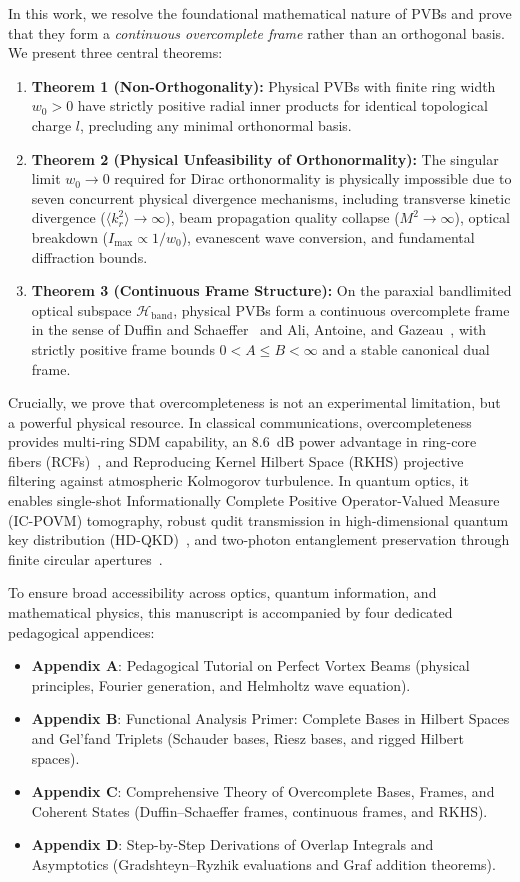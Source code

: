 \documentclass{optica-article}
\begin{document}
In this work, we resolve the foundational mathematical nature of PVBs and prove that they form a \emph{continuous overcomplete frame} rather than an orthogonal basis. We present three central theorems:
\begin{enumerate}
    \item \textbf{Theorem 1 (Non-Orthogonality):} Physical PVBs with finite ring width $w_0 > 0$ have strictly positive radial inner products for identical topological charge $l$, precluding any minimal orthonormal basis.
    \item \textbf{Theorem 2 (Physical Unfeasibility of Orthonormality):} The singular limit $w_0 \to 0$ required for Dirac orthonormality is physically impossible due to seven concurrent physical divergence mechanisms, including transverse kinetic divergence ($\langle k_r^2 \rangle \to \infty$), beam propagation quality collapse ($M^2 \to \infty$), optical breakdown ($I_{\max} \propto 1/w_0$), evanescent wave conversion, and fundamental diffraction bounds.
    \item \textbf{Theorem 3 (Continuous Frame Structure):} On the paraxial bandlimited optical subspace $\mathcal{H}_{\text{band}}$, physical PVBs form a continuous overcomplete frame in the sense of Duffin and Schaeffer~\cite{Duffin1952} and Ali, Antoine, and Gazeau~\cite{Ali1993}, with strictly positive frame bounds $0 < A \le B < \infty$ and a stable canonical dual frame.
\end{enumerate}

Crucially, we prove that overcompleteness is not an experimental limitation, but a powerful physical resource. In classical communications, overcompleteness provides multi-ring SDM capability, an 8.6~dB power advantage in ring-core fibers (RCFs)~\cite{Villalba2023}, and Reproducing Kernel Hilbert Space (RKHS) projective filtering against atmospheric Kolmogorov turbulence. In quantum optics, it enables single-shot Informationally Complete Positive Operator-Valued Measure (IC-POVM) tomography, robust qudit transmission in high-dimensional quantum key distribution (HD-QKD)~\cite{Cerf2002,Mirhosseini2015}, and two-photon entanglement preservation through finite circular apertures~\cite{Clauser1969}.

To ensure broad accessibility across optics, quantum information, and mathematical physics, this manuscript is accompanied by four dedicated pedagogical appendices:
\begin{itemize}
    \item \textbf{Appendix A}: Pedagogical Tutorial on Perfect Vortex Beams (physical principles, Fourier generation, and Helmholtz wave equation).
    \item \textbf{Appendix B}: Functional Analysis Primer: Complete Bases in Hilbert Spaces and Gel'fand Triplets (Schauder bases, Riesz bases, and rigged Hilbert spaces).
    \item \textbf{Appendix C}: Comprehensive Theory of Overcomplete Bases, Frames, and Coherent States (Duffin--Schaeffer frames, continuous frames, and RKHS).
    \item \textbf{Appendix D}: Step-by-Step Derivations of Overlap Integrals and Asymptotics (Gradshteyn--Ryzhik evaluations and Graf addition theorems).
\end{itemize}
\end{document}
